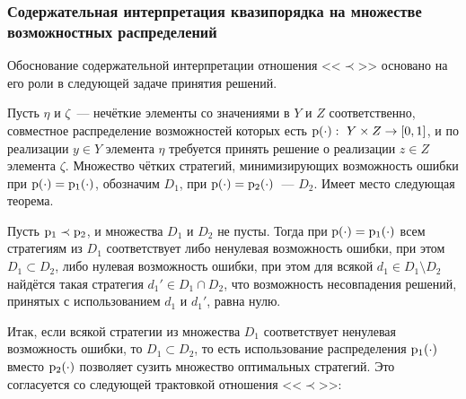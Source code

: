 \subsubsection{Содержательная интерпретация квазипорядка на множестве возможностных распределений}
\label{preorder_explain}

Обоснование содержательной интерпретации отношения <<$\prec$>> основано на его роли в следующей задаче принятия решений.

Пусть $\eta$ и $\zeta$~--- нечёткие элементы со значениями в $Y$ и $Z$ соответственно, совместное распределение возможностей которых есть ${\mathrm{p}}(\cdot):\ Y\times Z\to[0,1]$, и по реализации $y\in Y$ элемента $\eta$ требуется принять решение о реализации $z\in Z$ элемента $\zeta$. Множество чётких стратегий, минимизирующих возможность ошибки при ${\mathrm{p}}(\cdot) = {\mathrm{p}}_1(\cdot)$, обозначим $D_1$, при ${\mathrm{p}}(\cdot) = {\mathrm{p}}_2(\cdot)$~--- $D_2$.
Имеет место следующая теорема.

\begin{theorem}
\label{theorem_zubyuk}
    Пусть ${\mathrm{p}}_1\prec{\mathrm{p}}_2$, и множества $D_1$ и $D_2$ не пусты. Тогда при ${\mathrm{p}}(\cdot) = {\mathrm{p}}_1(\cdot)$ всем стратегиям из $D_1$ соответствует либо ненулевая возможность ошибки, при этом $D_1\subset D_2$, либо нулевая возможность ошибки, при этом для всякой $d_1\in D_1\setminus D_2$ найдётся такая стратегия $d_1'\in  D_1\cap D_2$, что возможность несовпадения решений, принятых с использованием $d_1$ и $d_1'$, равна нулю.
\end{theorem}

Итак, если всякой стратегии из множества $D_1$ соответствует ненулевая возможность ошибки, то $D_1\subset D_2$, то есть использование распределения ${\mathrm{p}}_1(\cdot)$ вместо ${\mathrm{p}}_2(\cdot)$ позволяет сузить множество оптимальных стратегий. 
Это согласуется со следующей трактовкой отношения <<$\prec$>>: 
\begin{center}  \end{center}


